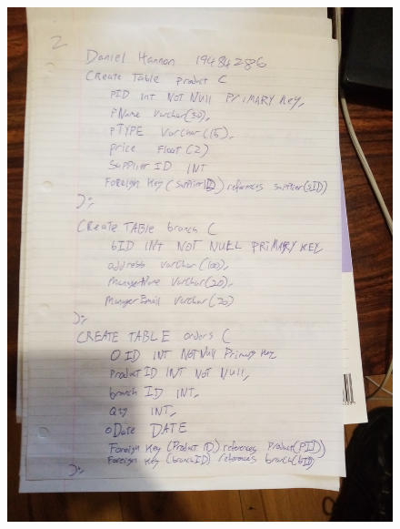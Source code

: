 \documentclass{article}
\begin{document}
	\begin{figure}
		\centering
		\includegraphics[width=\textwidth]{IMG_20210113_113116}
	\end{figure}
	\newpage
\end{document}
